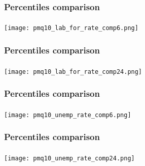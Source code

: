 \begin{frame}

    \label{perc_comparison_3}
    
    \frametitle{Percentiles comparison} %
    \framesubtitle{}  %
    \rmfamily %

    \begin{center}
        \texttt{[image: pmq10\_lab\_for\_rate\_comp6.png]}
    \end{center}
    
    \hyperlink{lab_force_rate_result}{}
    
\end{frame}

\begin{frame}

    \label{perc_comparison_31}
    
    \frametitle{Percentiles comparison} %
    \framesubtitle{}  %
    \rmfamily %

    \begin{center}
        \texttt{[image: pmq10\_lab\_for\_rate\_comp24.png]}
    \end{center}
    
    \hyperlink{lab_force_rate_result}{}
    
\end{frame}

\begin{frame}

    \label{perc_comparison_1}
    
    \frametitle{Percentiles comparison} %
    \framesubtitle{}  %
    \rmfamily %

    \begin{center}
        \texttt{[image: pmq10\_unemp\_rate\_comp6.png]}
    \end{center}
    
    \hyperlink{unemp_rate_result}{}
    
\end{frame}

\begin{frame}

    \label{perc_comparison_12}
    
    \frametitle{Percentiles comparison} %
    \framesubtitle{}  %
    \rmfamily %

    \begin{center}
        \texttt{[image: pmq10\_unemp\_rate\_comp24.png]}
    \end{center}
    
    \hyperlink{unemp_rate_result}{}
    
\end{frame}

